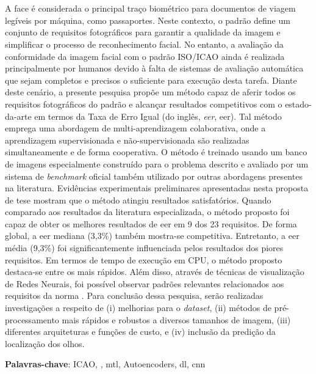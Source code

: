 \section*{}

\noindent
A face é considerada o principal traço biométrico para documentos de viagem legíveis por máquina, como passaportes. Neste contexto, o padrão \icao define um conjunto de requisitos fotográficos para garantir a qualidade da imagem e simplificar o processo de reconhecimento facial. No entanto, a avaliação da conformidade da imagem facial com o padrão ISO/ICAO ainda é realizada principalmente por humanos devido à falta de sistemas de avaliação automática que sejam completos e precisos o suficiente para execução desta tarefa. Diante deste cenário, a presente pesquisa propõe um método capaz de aferir todos os requisitos fotográficos do padrão \icao e alcançar resultados competitivos com o estado-da-arte em termos da Taxa de Erro Igual (do inglês, \textit{\acl{eer}}, \acs{eer}). Tal método emprega uma abordagem de multi-aprendizagem colaborativa, onde a aprendizagem supervisionada e não-supervisionada são realizadas simultaneamente e de forma cooperativa. O método é treinado usando um banco de imagens especialmente construído para o problema descrito e avaliado por um sistema de \textit{benchmark} oficial também utilizado por outras abordagens presentes na literatura. Evidências experimentais preliminares apresentadas nesta proposta de tese mostram que o método atingiu resultados satisfatórios. Quando comparado aos resultados da literatura especializada, o método proposto foi capaz de obter os melhores resultados de \acs{eer} em 9 dos 23 requisitos. De forma global, a \acs{eer} mediana (3,3\%) também mostra-se competitiva. Entretanto, a \acs{eer} média (9,3\%) foi significantemente influenciada pelos resultados dos piores requisitos. Em termos de tempo de execução em CPU, o método proposto destaca-se entre os mais rápidos. Além disso, através de técnicas de visualização de Redes Neurais, foi possível observar padrões relevantes relacionados aos requisitos da norma \icao. Para conclusão dessa pesquisa, serão realizadas investigações a respeito de (i) melhorias para o \textit{dataset}, (ii) métodos de pré-processamento mais rápidos e robustos a diversos tamanhos de imagem, (iii) diferentes arquiteturas e funções de custo, e (iv) inclusão da predição da localização dos olhos.

\vspace{2em}

\noindent
\textbf{Palavras-chave}: ICAO, \icao, \acl{mtl}, Autoencoders, \acl{dl}, \acl{cnn}

\newpage

